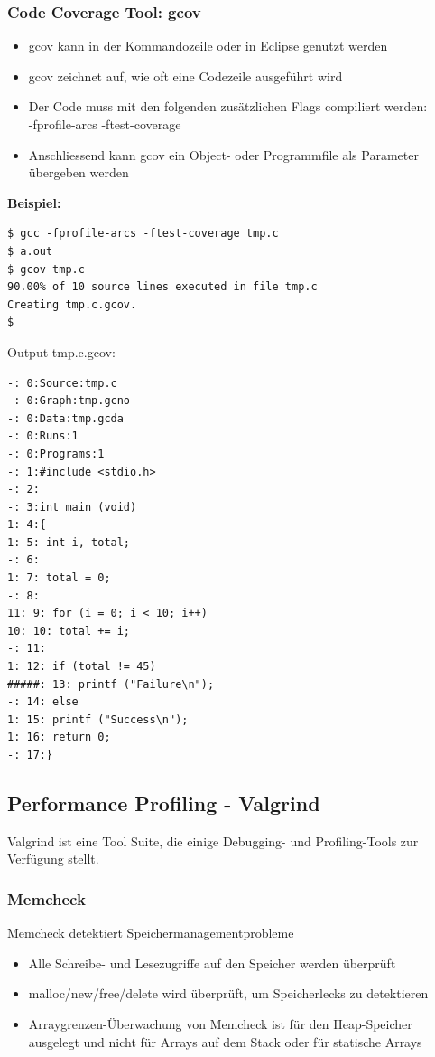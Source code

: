 \subsubsection{Code Coverage Tool: gcov}
\begin{itemize}
    \item gcov kann in der Kommandozeile oder in Eclipse genutzt werden
    \item gcov zeichnet auf, wie oft eine Codezeile ausgeführt wird
    \item Der Code muss mit den folgenden zusätzlichen Flags compiliert werden:\\-fprofile-arcs -ftest-coverage
    \item Anschliessend kann gcov ein Object- oder Programmfile als Parameter übergeben werden
\end{itemize}
\textbf{Beispiel:}
\begin{lstlisting}[style=bash]
$ gcc -fprofile-arcs -ftest-coverage tmp.c
$ a.out
$ gcov tmp.c
90.00% of 10 source lines executed in file tmp.c
Creating tmp.c.gcov.
$
\end{lstlisting}
Output tmp.c.gcov:
\begin{lstlisting}[style=bash]
-: 0:Source:tmp.c
-: 0:Graph:tmp.gcno
-: 0:Data:tmp.gcda
-: 0:Runs:1
-: 0:Programs:1
-: 1:#include <stdio.h>
-: 2:
-: 3:int main (void)
1: 4:{
1: 5: int i, total;
-: 6:
1: 7: total = 0;
-: 8:
11: 9: for (i = 0; i < 10; i++)
10: 10: total += i;
-: 11:
1: 12: if (total != 45)
#####: 13: printf ("Failure\n");
-: 14: else
1: 15: printf ("Success\n");
1: 16: return 0;
-: 17:}
\end{lstlisting}

\subsection{Performance Profiling - Valgrind}
Valgrind ist eine Tool Suite, die einige Debugging- und Profiling-Tools zur Verfügung stellt.

\subsubsection{Memcheck}
Memcheck detektiert Speichermanagementprobleme
\begin{itemize}
    \item Alle Schreibe- und Lesezugriffe auf den Speicher werden überprüft
    \item malloc/new/free/delete wird überprüft, um Speicherlecks zu detektieren
    \item Arraygrenzen-Überwachung von Memcheck ist für den Heap-Speicher ausgelegt und nicht für Arrays auf dem Stack oder für statische Arrays
\end{itemize}
